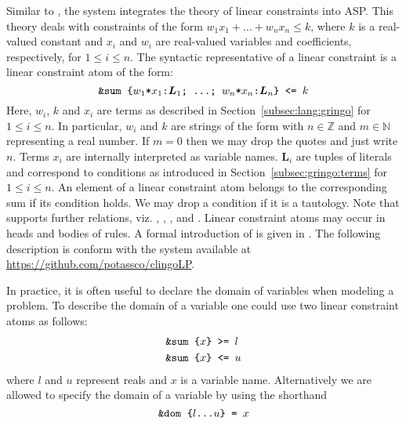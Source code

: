 Similar to , the system  integrates the theory of linear constraints into ASP.
%
This theory deals with constraints of the form $w_1x_1+\dots+w_nx_n\leq k$, 
where $k$ is a real-valued constant and $x_i$ and $w_i$ are real-valued variables and coefficients, respectively, for $1\leq i\leq n$. 
%
The syntactic representative of a linear constraint is a linear constraint atom of the form: 
\[
\texttt{\&sum\text{ }\{$w_1$*$x_1$:$\boldsymbol{L}_1$;\text{ }\dots;\text{ }$w_n$*$x_n$:$\boldsymbol{L}_n$\}\text{ }<=\text{ }$k$} 
\]
%
Here, $w_i$, $k$ and $x_i$ are terms as described in Section~\ref{subsec:lang:gringo} for $1\leq i\leq n$. 
%
In particular, $w_i$ and $k$ are strings of the form  with $n\in\mathbb{Z}$ and $m\in\mathbb{N}$ representing a real number.
%
If $m=0$ then we may drop the quotes and just write $n$.
%
Terms $x_i$ are internally interpreted as variable names. 
%
$\boldsymbol{L}_i$ are tuples of literals and correspond to conditions as introduced in Section~\ref{subsec:gringo:terms} for $1\leq i\leq n$.
%
An element of a linear constraint atom belongs to the corresponding sum if its condition holds.
%
We may drop a condition if it is a tautology. 
%
Note that  supports further relations, viz. \code{>=}, \code{<}, \code{>}, \code{=} and \code{!=}.
%
Linear constraint atoms may occur in heads and bodies of rules. 
%
A formal introduction of  is given in \cite{jakaosscscwa17a}.
%
The following description is conform with the  system available at \url{https://github.com/potassco/clingoLP}.

In practice, it is often useful to declare the domain of variables when modeling a problem.
%
To describe the domain of a variable 
one could use two linear constraint atoms as follows:  
\begin{align*}
&\texttt{\&sum\text{ }\{$x$\}\text{ }>=\text{ }$l$}\\
&\texttt{\&sum\text{ }\{$x$\}\text{ }<=\text{ }$u$}
\end{align*}
where $l$ and $u$ represent reals and $x$ is a variable name. 
%
Alternatively we are allowed to specify the domain of a variable by using the shorthand  
\[
\texttt{\&dom\text{ }\{$l$\dots$u$\}\text{ }=\text{ }$x$}
\]

